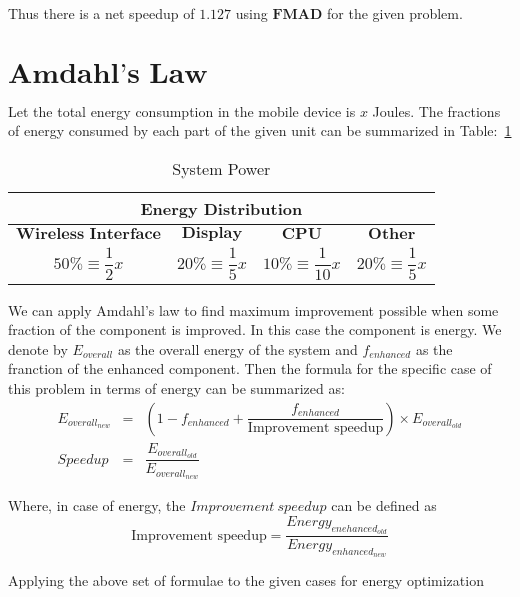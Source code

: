 \documentclass{tufte-handout}
\begin{document}
	Thus there is a net speedup of $1.127$ using $\textbf{FMAD}$ for the given problem.

\newpage
\section{$\textbf{Amdahl's Law}$}
	Let the total energy consumption in the mobile device is $x$ Joules. The fractions of energy consumed by each part of the given unit can be summarized in Table:~\ref{tab:frac-tab}
	\begin{table}[!htb]
	    \centering
	    \selectfont
		\renewcommand{\arraystretch}{3.0}
		\label{tab:frac-tab}
	    \begin{tabular}{c|c|c|c|}
	      \toprule
		  \multicolumn{4}{|c|}{Energy Distribution}  \\
	      \midrule 
		  $\textbf{Wireless Interface}$ & $\textbf{Display}$ & $\textbf{CPU}$ & $\textbf{Other}$ \\  %
		  $50\% \equiv \dfrac{1}{2}x$  & $20\% \equiv \dfrac{1}{5}x$ & $10\% \equiv \dfrac{1}{10}x$ & $20\% \equiv \dfrac{1}{5}x$ \\
	      \bottomrule
	    \end{tabular}
	    \caption{ System Power }
	  \end{table}

	  We can apply Amdahl's law to find maximum improvement possible when some fraction of the component is improved. In this case the component is energy. We denote by $E_{overall}$ as the overall energy of the system and $f_{enhanced}$ as the franction of the enhanced component. Then the formula for the specific case of this problem in terms of energy can be summarized as:
	  \begin{eqnarray*}
	  	E_{overall_{new}} &=& (1 - f_{enhanced} + \dfrac{f_{enhanced}}{\mbox{Improvement speedup}}) \times E_{overall_{old}} \\
		Speedup &=& \dfrac{E_{overall_{old}}}{E_{overall_{new}}}
	  \end{eqnarray*}

	  Where, in case of energy, the $Improvement\ speedup$ can be defined as
	  \[
	  	\mbox{Improvement speedup} = \dfrac{Energy_{enehanced_{old}}}{Energy_{enhanced_{new}}}
	  \]

	  Applying the above set of formulae to the given cases for energy optimization
\end{document}
